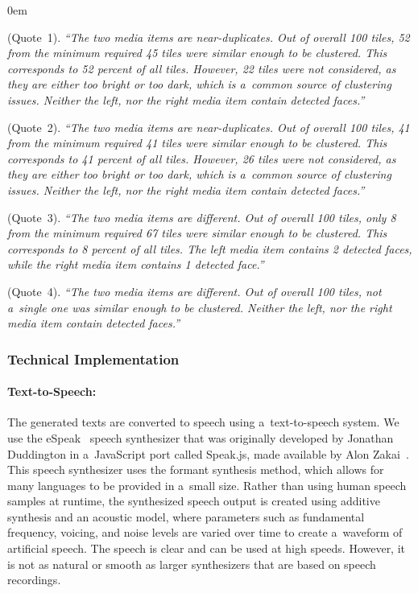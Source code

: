 \begin{description}
  \itemsep0em
  \item[Clustering Consent] (Quote~1). \textit{``The two media items
    are near-duplicates. Out of overall 100 tiles,
    52 from the minimum required 45 tiles
    were similar enough to be clustered. This corresponds to 52 percent
    of all tiles. However, 22 tiles were not considered,
    as they are either too bright or too dark,
    which is a~common source of clustering issues.
    Neither the left, nor the right media item contain detected faces.''}
  \item[Clustering Dissent] (Quote~2). \textit{``The two media items
    are near-duplicates. Out of overall 100 tiles,
    41 from the minimum required 41 tiles were similar enough to be clustered.
    This corresponds to 41 percent of all tiles.
    However, 26 tiles were not considered, as they are either too bright
    or too dark, which is a~common source of clustering issues.
    Neither the left, nor the right media item contain detected faces.''}
  \item[Non-Clustering Dissent] (Quote~3). \textit{``The two media items
    are different. Out of overall 100 tiles,
    only 8 from the minimum required 67 tiles
    were similar enough to be clustered. This corresponds to 8 percent of all tiles.
    The left media item contains 2 detected faces,
    while the right media item contains 1 detected face.''}
  \item[(Non-Clustering Consent)] (Quote~4). \textit{``The two media items
    are different. Out of overall 100 tiles, not a~single one
    was similar enough to be clustered. Neither the left,
    nor the right media item contain detected faces.''}
\end{description}

\subsubsection{Technical Implementation}

\paragraph{Text-to-Speech:}

The generated texts are converted to speech using a~text-to-speech system.
We use the eSpeak~\cite{duddington2012espeak} speech synthesizer
that was originally developed by Jonathan Duddington
in a~JavaScript port called Speak.js,
made available by Alon Zakai~\cite{zakai2012speakjs}.
This speech synthesizer uses the formant synthesis method,
which allows for many languages to be provided in a~small size.
Rather than using human speech samples at runtime,
the synthesized speech output is created using additive synthesis
and an acoustic model, where parameters
such as fundamental frequency, voicing, and noise levels
are varied over time to create a~waveform of artificial speech.
The speech is clear and can be used at high speeds.
However, it is not as natural or smooth as larger synthesizers
that are based on speech recordings.

